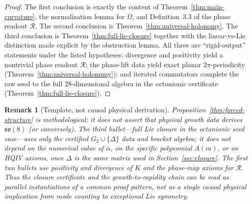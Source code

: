 \documentclass[11pt]{amsart}
\newtheorem{remark}[theorem]{Remark}
\begin{document}
\begin{proof}
The first conclusion is exactly the content of Theorem~\ref{thm:main-curvature}, the normalization lemma for \(\Omega\), and Definition~3.3 of the phase readout \(\mathcal R\). The second conclusion is Theorem~\ref{thm:universal-holonomy}. The third conclusion is Theorem~\ref{thm:full-lie-closure} together with the linear-vs-Lie distinction made explicit by the obstruction lemma.
All three are ``rigid-output'' statements under the listed hypotheses: divergence and positivity yield a nontrivial phase readout \(\mathcal R\); the phase-lift data yield exact planar \(2\pi\)-periodicity (Theorem~\ref{thm:universal-holonomy}); and iterated commutators complete the raw seed to the full \(28\)-dimensional algebra in the octonionic certificate (Theorem~\ref{thm:full-lie-closure}).
\end{proof}

\begin{remark}[Template, not causal physical derivation]
Proposition~\ref{thm:forced-structure} is methodological: it does not assert that physical growth data \emph{derives} \(\mathfrak{so}(8)\) (or conversely). The third bullet---full Lie closure in the octonionic seed case---uses only the certified \(G_2\cup\{\Delta\}\) data and bracket algebra; it does not depend on the numerical value of \(\alpha\), on the specific polynomial \(A(m)\), or on HQIV axioms, once \(\Delta\) is the same matrix used in Section~\ref{sec:closure}. The first two bullets use positivity and divergence of \(K\) and the phase-map axioms for \(\mathcal R\). Thus the \emph{closure certificate} and the \emph{growth-to-rapidity chain} can be read as parallel instantiations of a common proof pattern, not as a single causal physical implication from mode counting to exceptional Lie symmetry.
\end{remark}
\end{document}
